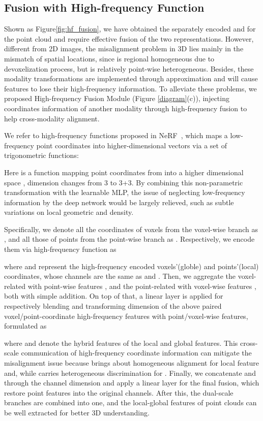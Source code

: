 \documentclass[sigconf]{acmart}
\begin{document}
\subsection{Fusion with High-frequency Function}
\label{fusion}
Shown as Figure\ref{fig:hf_fusion}, we have obtained the separately encoded  and  for the point cloud and require effective fusion of the two representations. However, different from 2D images, the misalignment problem in 3D lies mainly in the mismatch of spatial locations, since  is regional homogeneous due to devoxelization process, but  is relatively point-wise heterogeneous. Besides, these modality transformations are implemented through approximation and will cause features to lose their high-frequency information. To alleviate these problems, we proposed High-frequency Fusion Module (Figure \ref{diagram}(c)), injecting coordinates information of another modality through high-frequency fusion to help cross-modality alignment.

We refer to high-frequency functions proposed in NeRF~\cite{mildenhall2020nerf}, which maps a low-frequency point coordinates into higher-dimensional vectors via a set of trigonometric functions:


Here  is a function mapping point coordinates  from  into a higher dimensional space , dimension changes from 3 to 3+3.
By combining this non-parametric transformation with the learnable MLP, the issue of neglecting low-frequency information by the deep network would be largely relieved, such as subtle variations on local geometric and density. 


Specifically, we denote all the coordinates of voxels from the voxel-wise branch as , and all those of points from the point-wise branch as . Respectively, we encode them via high-frequency function  as

where  and  represent the high-frequency encoded voxels'(globle) and points'(local) coordinates, whose channels are the same as  and . Then, we aggregate the voxel-related  with point-wise features , and the point-related  with voxel-wise features , both with simple addition. On top of that, a linear layer is applied for respectively blending and transforming dimension of the above paired voxel/point-coordinate high-frequency features with point/voxel-wise features, formulated as

where  and  denote the hybrid features of the local and global features. This cross-scale communication of high-frequency coordinate information can mitigate the misalignment issue because  brings about homogeneous alignment for local feature  and, while  carries heterogeneous discrimination for . Finally, we concatenate  and  through the channel dimension and apply a linear layer for the final fusion, which restore point features into the original  channels. After this, the dual-scale branches are combined into one, and the local-global features of point clouds can be well extracted for better 3D understanding.
\end{document}

